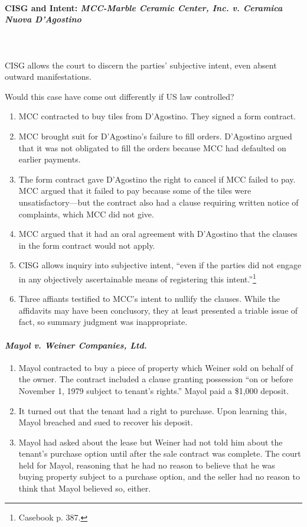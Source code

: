 \paragraph{CISG and Intent: \emph{MCC-Marble Ceramic Center, Inc. v. 
Ceramica Nuova D'Agostino}}
~\\\\
CISG allows the court to discern the parties' subjective intent, even absent 
outward manifestations.

Would this case have come out differently if US law controlled?

\begin{enumerate}
    \item MCC contracted to buy tiles from D'Agostino. They signed a form 
    contract.
    \item MCC brought suit for D'Agostino's failure to fill orders. D'Agostino 
    argued that it was not obligated to fill the orders because MCC had 
    defaulted on earlier payments.
    \item The form contract gave D'Agostino the right to cancel if MCC failed 
    to pay. MCC argued that it failed to pay because some of the tiles were 
    unsatisfactory---but the contract also had a clause requiring written 
    notice of complaints, which MCC did not give.
    \item MCC argued that it had an oral agreement with D'Agostino that the 
    clauses in the form contract would not apply.
    \item CISG allows inquiry into subjective intent, ``even if the parties 
    did not engage in any objectively ascertainable means of registering this 
    intent.''\footnote{Casebook p. 387.}
    \item Three affiants testified to MCC's intent to nullify the clauses. 
    While the affidavits may have been conclusory, they at least presented a 
    triable issue of fact, so summary judgment was inappropriate.
\end{enumerate}

\paragraph{\emph{Mayol v. Weiner Companies, Ltd.}}

\begin{enumerate}
    \item Mayol contracted to buy a piece of property which Weiner sold on 
    behalf of the owner. The contract included a clause granting possession 
    ``on or before November 1, 1979 subject to tenant's rights.'' Mayol paid a 
    \$1,000 deposit.
    \item It turned out that the tenant had a right to purchase. Upon learning 
    this, Mayol breached and sued to recover his deposit.
    \item Mayol had asked about the lease but Weiner had not told him about 
    the tenant's purchase option until after the sale contract was complete. 
    The court held for Mayol, reasoning that he had no reason to believe that 
    he was buying property subject to a purchase option, and the seller had no 
    reason to think that Mayol believed so, either.
\end{enumerate}

